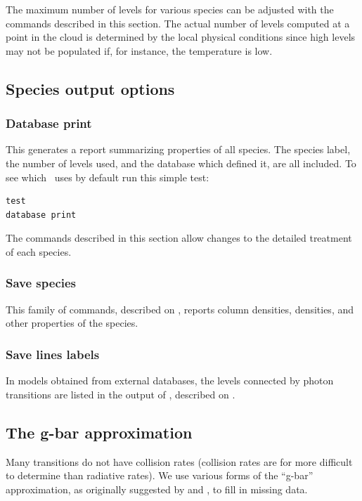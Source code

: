 The maximum number of levels for various species can be adjusted with the
commands described in this section.
The actual number of levels computed at a point in the cloud is determined
by the local physical conditions since high levels may not be populated if,
for instance, the temperature is low.

\subsection{Species output options}

\subsubsection{Database print}
This generates a report summarizing properties of all species.
The species label, the number of levels used, and the database
which defined it, are all included.
To see which \Cloudy\ uses by default run this simple test:
\begin{verbatim}
test
database print
\end{verbatim}
The commands described in this section allow changes to the detailed
treatment of each species.

\subsubsection{Save species}
This family of commands, described on 
\pageref{sec:SaveSpecies},
 reports column densities, densities, and other properties
of the species.

\subsubsection{Save lines labels}
In models obtained from external databases, the levels connected by photon
transitions are listed in the output of ,
described on \pageref{sec:SaveLineLabels}.

\subsection{The g-bar approximation}

Many transitions do not have collision rates
(collision rates are for more difficult to determine than radiative rates).
We use various forms of the ``g-bar'' approximation,
as originally suggested by 
\citet{Seaton1962} and \citet{VanRegemorter1962},
to fill in missing data.

